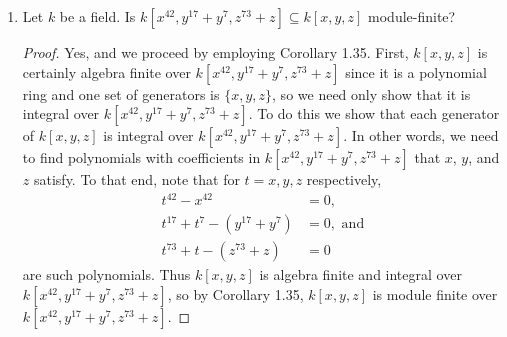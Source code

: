 \documentclass[11pt,oneside,english]{amsart}
\theoremstyle{definition}
\newcommand{\MB}[1]{\mathbb{#1}}
\begin{document}
\begin{enumerate}[leftmargin=*]
\begin{proof}
First, $R$ is the set of all polynomials that are $K$-linear combinations of $x^{2i+3j}$ ($i,j\geq0$), but since any $n\in\MB{Z}^+$ with $n\geq2$ can be written in the form $n=2i+3j$,  we have that $R$ consists of all polynomials of the form $a_0+a_2x^2+a_3x^3+\cdots$ where $a_k\in K$, i.e. polynomials without the linear term. For ease, we will write
\[
R=\{a_0+a_2x^2+a_3x^3+\cdots+a_nx^n\}.
\]
We also have that
\begin{align*}
I=x^2R&=\{\text{``stuff in $R$ multiplied by $x^2$''}\}\\[2mm]
&=\{b_0x^2+b_1x^4+b_2x^5+\cdots+b_nx^{n+2}\}.
\end{align*}
Notice that there are no $x^3$ terms in the elements of $I$. Then
\begin{align*}
IS=x^2RK[x]&=\{\text{``stuff in $K[x]$ multiplied by stuff in $I$ and summed''}\}\\[2mm]
&=\{c_0x^2+c_1x^3+c_2x^4+\cdots+c_nx^{n+2}\}.
\end{align*}
Thus,
\[
IS\cap R=\{d_0x^2+d_1x^3+d_2x^4+\cdots+d_nx^{n+2}\}\supsetneq I
\]
\end{proof}


\item Let $k$ be a field. Is $k[x^{42},y^{17}+y^7,z^{73}+z]\subseteq k[x,y,z]$ module-finite?

\begin{proof}
Yes, and we proceed by employing Corollary 1.35. First, $k[x,y,z]$ is certainly algebra finite over $k[x^{42},y^{17}+y^7,z^{73}+z]$ since it is a polynomial ring and one set of generators is $\{x,y,z\}$, so we need only show that it is integral over $k[x^{42},y^{17}+y^7,z^{73}+z]$. To do this we show that each generator of $k[x,y,z]$ is integral over $k[x^{42},y^{17}+y^7,z^{73}+z]$. In other words, we need to find polynomials with coefficients in $k[x^{42},y^{17}+y^7,z^{73}+z]$ that $x$, $y$, and $z$ satisfy. To that end, note that for $t=x, y, z$ respectively, 
\begin{align*}
t^{42}-x^{42}&=0,\\[2mm]
t^{17}+t^7-(y^{17}+y^7)&=0,\text{ and}\\[2mm]
t^{73}+t-(z^{73}+z)&=0
\end{align*}
are such polynomials. Thus $k[x,y,z]$ is algebra finite and integral over $k[x^{42},y^{17}+y^7,z^{73}+z]$, so by Corollary 1.35, $k[x,y,z]$ is module finite over $k[x^{42},y^{17}+y^7,z^{73}+z]$.
\end{proof}



\end{enumerate}
\end{document}
